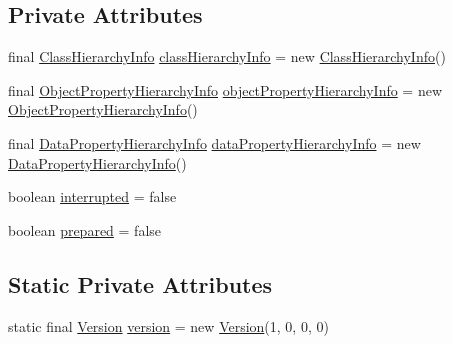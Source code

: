 \subsection*{Private Attributes}
\begin{DoxyCompactItemize}
\item 
final \hyperlink{classorg_1_1semanticweb_1_1owlapi_1_1reasoner_1_1structural_1_1_structural_reasoner_1_1_class_hierarchy_info}{Class\-Hierarchy\-Info} \hyperlink{classorg_1_1semanticweb_1_1owlapi_1_1reasoner_1_1structural_1_1_structural_reasoner_a18277b2f754df2746e816eb8e0f79a3d}{class\-Hierarchy\-Info} = new \hyperlink{classorg_1_1semanticweb_1_1owlapi_1_1reasoner_1_1structural_1_1_structural_reasoner_1_1_class_hierarchy_info}{Class\-Hierarchy\-Info}()
\item 
final \hyperlink{classorg_1_1semanticweb_1_1owlapi_1_1reasoner_1_1structural_1_1_structural_reasoner_1_1_object_property_hierarchy_info}{Object\-Property\-Hierarchy\-Info} \hyperlink{classorg_1_1semanticweb_1_1owlapi_1_1reasoner_1_1structural_1_1_structural_reasoner_addec294d2c9ddd1d52c422ddb80fabf1}{object\-Property\-Hierarchy\-Info} = new \hyperlink{classorg_1_1semanticweb_1_1owlapi_1_1reasoner_1_1structural_1_1_structural_reasoner_1_1_object_property_hierarchy_info}{Object\-Property\-Hierarchy\-Info}()
\item 
final \hyperlink{classorg_1_1semanticweb_1_1owlapi_1_1reasoner_1_1structural_1_1_structural_reasoner_1_1_data_property_hierarchy_info}{Data\-Property\-Hierarchy\-Info} \hyperlink{classorg_1_1semanticweb_1_1owlapi_1_1reasoner_1_1structural_1_1_structural_reasoner_a43c1f21d5b95e5d06e0c5587fc59bba6}{data\-Property\-Hierarchy\-Info} = new \hyperlink{classorg_1_1semanticweb_1_1owlapi_1_1reasoner_1_1structural_1_1_structural_reasoner_1_1_data_property_hierarchy_info}{Data\-Property\-Hierarchy\-Info}()
\item 
boolean \hyperlink{classorg_1_1semanticweb_1_1owlapi_1_1reasoner_1_1structural_1_1_structural_reasoner_a26b4613210b806eda970079dff305f9f}{interrupted} = false
\item 
boolean \hyperlink{classorg_1_1semanticweb_1_1owlapi_1_1reasoner_1_1structural_1_1_structural_reasoner_ac1707645b4620d6a9b6615558bbe5ec0}{prepared} = false
\end{DoxyCompactItemize}
\subsection*{Static Private Attributes}
\begin{DoxyCompactItemize}
\item 
static final \hyperlink{classorg_1_1semanticweb_1_1owlapi_1_1util_1_1_version}{Version} \hyperlink{classorg_1_1semanticweb_1_1owlapi_1_1reasoner_1_1structural_1_1_structural_reasoner_a790d96341137347399bc05f159a605ac}{version} = new \hyperlink{classorg_1_1semanticweb_1_1owlapi_1_1util_1_1_version}{Version}(1, 0, 0, 0)
\end{DoxyCompactItemize}


